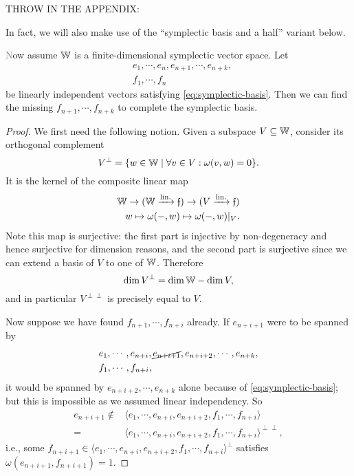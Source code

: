 \color{gray}THROW IN THE APPENDIX: 

In fact, we will also make use of the ``symplectic basis and a half'' variant below. 
\begin{proposition}\label{prop:symplectic-basis-and-a-half}\textcolor{gray}
    Now assume $\mathbb{W}$ is a finite-dimensional symplectic vector space.
    Let 
    \begin{align*} 
        &e_1, \cdots, e_n, e_{n+1}, \cdots, e_{n+k}, \\
        &f_1, \cdots, f_n
    \end{align*}
    be linearly independent vectors satisfying \eqref{eq:symplectic-basis}.
    Then we can find the missing $f_{n+1}, \cdots, f_{n+k}$ to complete the symplectic basis.
\end{proposition}
\begin{proof}
    We first need the following notion.
    Given a subspace $V \subseteq \mathbb{W}$, consider its orthogonal complement
    \[
        V^\perp = \{ w \in \mathbb{W} \mid \forall v \in V : \omega(v, w) = 0 \}.
    \]
    It is the kernel of the composite linear map 
    \begin{align*}
        \mathbb{W} \to (\mathbb{W} \xrightarrow{\text{lin.}} \mathfrak{f}) \to (V \xrightarrow{\text{lin.}} \mathfrak{f}) \\
        w \mapsto \omega(-, w) \mapsto \omega(-, w)|_V.
    \end{align*}
    Note this map is surjective:
    the first part is injective by non-degeneracy and hence surjective for dimension reasons,
    and the second part is surjective since we can extend a basis of $V$ to one of $\mathbb{W}$.
    Therefore 
    \[
        \dim V^\perp = \dim \mathbb{W} - \dim V,
    \]
    and in particular $V^{\perp \perp}$ is precisely equal to $V$.

    Now suppose we have found $f_{n+1}, \cdots, f_{n+i}$ already.
    If $e_{n+i+1}$ were to be spanned by 
    \begin{align*}
        &e_1, \cdots, e_{n+i}, \cancel{e_{n+i+1}}, e_{n+i+2}, \cdots, e_{n+k},\\ 
        &f_1, \cdots, f_{n+i},
    \end{align*}
    it would be spanned by $e_{n+i+2}, \cdots, e_{n+k}$ alone because of \eqref{eq:symplectic-basis};
    but this is impossible as we assumed linear independency.
    So 
    \begin{align*}
        e_{n+i+1} 
        \not\in{} &\langle e_1, \cdots, e_{n+i}, e_{n+i+2}, f_1, \cdots, f_{n+i} \rangle \\
        ={} &\langle e_1, \cdots, e_{n+i}, e_{n+i+2}, f_1, \cdots, f_{n+i} \rangle^{\perp \perp},
    \end{align*}
    i.e., some $f_{n+i+1} \in \langle e_1, \cdots, e_{n+i}, e_{n+i+2}, f_1, \cdots, f_{n+i} \rangle^\perp$ satisfies $\omega(e_{n+i+1}, f_{n+i+1}) = 1$.
\end{proof}


